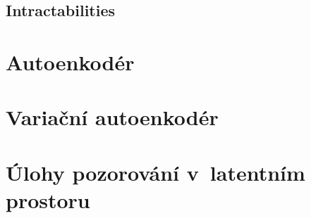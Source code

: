 \documentclass[11pt,a4paper]{report}
\begin{document}
\section{Intractabilities} 

\chapter{Autoenkodér}
\label{chap:autoencoder}
















\chapter{Variační autoenkodér}
\label{chap:vae}
















\chapter{Úlohy pozorování v~latentním prostoru}
\label{chap:applications}
\end{document}

